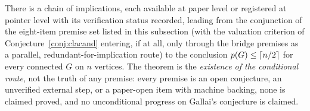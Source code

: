 \begin{theorem}\label{int:thm-ledger}
There is a chain of implications, each available at paper level or registered at pointer
level with its verification status recorded, leading from the conjunction of the eight-item
premise set listed in this subsection (with the valuation criterion of
Conjecture~\ref{conj:clacand} entering, if at all, only through the bridge premises as a
parallel, redundant-for-implication route) to the conclusion
$p(G)\le\left\lceil n/2 \right\rceil$ for every connected $G$ on $n$ vertices. The theorem is the
\emph{existence of the conditional route}, not the truth of any premise: every premise is an
open conjecture, an unverified external step, or a paper-open item with machine backing,
none is claimed proved, and no unconditional progress on Gallai's conjecture is claimed.
\end{theorem}

